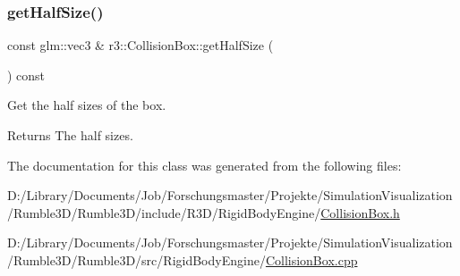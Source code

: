 \subsubsection{\texorpdfstring{get\+Half\+Size()}{getHalfSize()}}
{\footnotesize\ttfamily const glm\+::vec3 \& r3\+::\+Collision\+Box\+::get\+Half\+Size (\begin{DoxyParamCaption}{ }\end{DoxyParamCaption}) const}



Get the half sizes of the box. 

\begin{DoxyReturn}{Returns}
The half sizes. 
\end{DoxyReturn}


The documentation for this class was generated from the following files\+:\begin{DoxyCompactItemize}
\item 
D\+:/\+Library/\+Documents/\+Job/\+Forschungsmaster/\+Projekte/\+Simulation\+Visualization/\+Rumble3\+D/\+Rumble3\+D/include/\+R3\+D/\+Rigid\+Body\+Engine/\mbox{\hyperlink{_collision_box_8h}{Collision\+Box.\+h}}\item 
D\+:/\+Library/\+Documents/\+Job/\+Forschungsmaster/\+Projekte/\+Simulation\+Visualization/\+Rumble3\+D/\+Rumble3\+D/src/\+Rigid\+Body\+Engine/\mbox{\hyperlink{_collision_box_8cpp}{Collision\+Box.\+cpp}}\end{DoxyCompactItemize}
